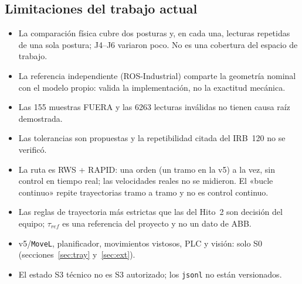 \documentclass[10pt,a4paper]{article}
\begin{document}
\subsection{Limitaciones del trabajo actual}
\begin{itemize}[leftmargin=*]
\item La comparación física cubre dos posturas y, en cada una, lecturas repetidas de una sola postura; J4--J6 variaron poco. No es una cobertura del espacio de trabajo.
\item La referencia independiente (ROS-Industrial) comparte la geometría nominal con el modelo propio: valida la implementación, no la exactitud mecánica.
\item Las 155 muestras FUERA y las 6263 lecturas inválidas no tienen causa raíz demostrada.
\item Las tolerancias son propuestas y la repetibilidad citada del IRB~120 no se verificó.
\item La ruta es RWS + RAPID: una orden (un tramo en la v5) a la vez, sin control en tiempo real; las velocidades reales no se midieron. El «bucle continuo» repite trayectorias tramo a tramo y no es control continuo.
\item Las reglas de trayectoria más estrictas que las del Hito~2 son decisión del equipo; $\tau_{ref}$ es una referencia del proyecto y no un dato de ABB.
\item v5/\texttt{MoveL}, planificador, movimientos vistosos, PLC y visión: solo S0 (secciones~\ref{sec:tray} y~\ref{sec:ext}).
\item El estado S3 técnico no es S3 autorizado; los \texttt{jsonl} no están versionados.
\end{itemize}
\end{document}
